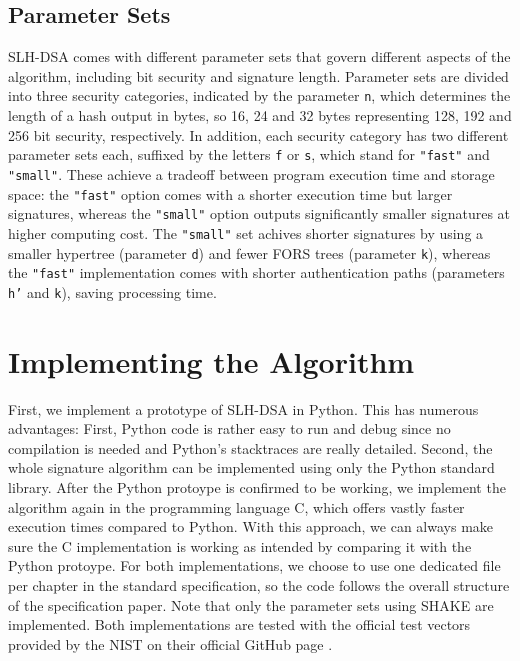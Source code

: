 \documentclass[journal=tosc,notanonymous]{iacrtrans}
\begin{document}
\subsection{Parameter Sets}

SLH-DSA comes with different parameter sets that govern different aspects of the algorithm, including bit security and signature length.
Parameter sets are divided into three security categories, indicated by the parameter \texttt{n}, which determines the length of a hash output in bytes, so 16, 24 and 32 bytes representing 128, 192 and 256 bit security, respectively.
In addition, each security category has two different parameter sets each, suffixed by the letters \texttt{f} or \texttt{s}, which stand for \texttt{"fast"} and \texttt{"small"}.
These achieve a tradeoff between program execution time and storage space: the \texttt{"fast"} option comes with a shorter execution time but larger signatures, whereas the \texttt{"small"} option outputs significantly smaller signatures at higher computing cost.
The \texttt{"small"} set achives shorter signatures by using a smaller hypertree (parameter \texttt{d}) and fewer FORS trees (parameter \texttt{k}), whereas the \texttt{"fast"} implementation comes with shorter authentication paths (parameters \texttt{h'} and \texttt{k}), saving processing time.


\section{Implementing the Algorithm}

First, we implement a prototype of SLH-DSA in Python.
This has numerous advantages: First, Python code is rather easy to run and debug since no compilation is needed and Python's stacktraces are really detailed.
Second, the whole signature algorithm can be implemented using only the Python standard library.
After the Python protoype is confirmed to be working, we implement the algorithm again in the programming language C, which offers vastly faster execution times compared to Python.
With this approach, we can always make sure the C implementation is working as intended by comparing it with the Python protoype.
For both implementations, we choose to use one dedicated file per chapter in the standard specification, so the code follows the overall structure of the specification paper.
Note that only the parameter sets using SHAKE are implemented.
Both implementations are tested with the official test vectors provided by the NIST on their official GitHub page \cite{usnistgov-2024}.
\end{document}
